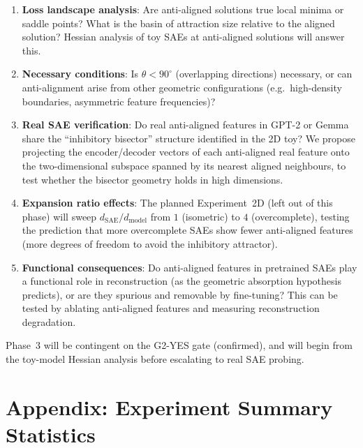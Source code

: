 \documentclass[11pt,a4paper]{article}
\begin{document}
\begin{enumerate}
  \item \textbf{Loss landscape analysis}: Are anti-aligned solutions true local minima
        or saddle points?  What is the basin of attraction size relative to the aligned
        solution?  Hessian analysis of toy SAEs at anti-aligned solutions will answer this.

  \item \textbf{Necessary conditions}: Is $\theta < 90^\circ$ (overlapping directions)
        necessary, or can anti-alignment arise from other geometric configurations
        (e.g.\ high-density boundaries, asymmetric feature frequencies)?

  \item \textbf{Real SAE verification}: Do real anti-aligned features in GPT-2 or Gemma
        share the ``inhibitory bisector'' structure identified in the 2D toy?  We propose
        projecting the encoder/decoder vectors of each anti-aligned real feature onto the
        two-dimensional subspace spanned by its nearest aligned neighbours, to test whether
        the bisector geometry holds in high dimensions.

  \item \textbf{Expansion ratio effects}: The planned Experiment~2D (left out of this
        phase) will sweep $d_{\mathrm{SAE}} / d_{\mathrm{model}}$ from $1$ (isometric)
        to $4$ (overcomplete), testing the prediction that more overcomplete SAEs show
        fewer anti-aligned features (more degrees of freedom to avoid the inhibitory attractor).

  \item \textbf{Functional consequences}: Do anti-aligned features in pretrained SAEs
        play a functional role in reconstruction (as the geometric absorption hypothesis
        predicts), or are they spurious and removable by fine-tuning?  This can be
        tested by ablating anti-aligned features and measuring reconstruction degradation.
\end{enumerate}

Phase~3 will be contingent on the G2-YES gate (confirmed), and will begin from the
toy-model Hessian analysis before escalating to real SAE probing.

\newpage
\section*{Appendix: Experiment Summary Statistics}
\label{app:stats}
\end{document}

